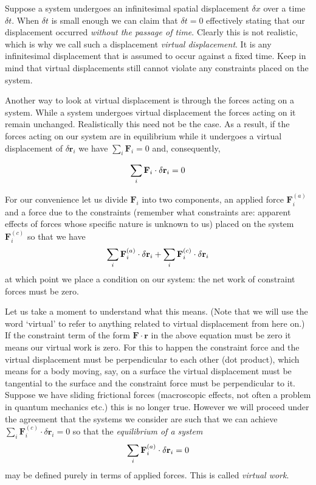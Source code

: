 \documentclass[english,seminar,headertitle]{lecture}
\begin{document}
Suppose a system undergoes an infinitesimal spatial displacement $\delta x$ over a time $\delta t$. When $\delta t$ is small enough we can claim that $\delta t = 0$ effectively stating that our displacement occurred \textit{without the passage of time}. Clearly this is not realistic, which is why we call such a displacement \textit{virtual displacement}. It is any infinitesimal displacement that is assumed to occur against a fixed time. Keep in mind that virtual displacements still cannot violate any constraints placed on the system.

Another way to look at virtual displacement is through the forces acting on a system. While a system undergoes virtual displacement the forces acting on it remain unchanged. Realistically this need not be the case. As a result, if the forces acting on our system are in equilibrium while it undergoes a virtual displacement of $\delta \mathbf{r}_i$ we have $\sum_i \mathbf{F}_i = 0$ and, consequently,

\begin{equation}
\sum\displaylimits_i \mathbf{F}_i \cdot \delta \mathbf{r}_i = 0 \label{eq:virtual-displacement}
\end{equation}

For our convenience let us divide $\mathbf{F}_i$ into two components, an applied force $\mathbf{F}_i^{(a)}$ and a force due to the constraints (remember what constraints are: apparent effects of forces whose specific nature is unknown to us) placed on the system $\mathbf{F}_i^{(c)}$ so that we have $$\sum\displaylimits_i \mathbf{F}_i^{(a)} \cdot \delta \mathbf{r}_i + \sum\displaylimits_i \mathbf{F}_i^{(c)} \cdot \delta \mathbf{r}_i$$ at which point we place a condition on our system: the net work of constraint forces must be zero. 

Let us take a moment to understand what this means. (Note that we will use the word `virtual' to refer to anything related to virtual displacement from here on.) If the constraint term of the form $\mathbf{F} \cdot \mathbf{r}$ in the above equation must be zero it means our virtual work is zero. For this to happen the constraint force and the virtual displacement must be perpendicular to each other (dot product), which means for a body moving, say, on a surface the virtual displacement must be tangential to the surface and the constraint force must be perpendicular to it. Suppose we have sliding frictional forces (macroscopic effects, not often a problem in quantum mechanics etc.) this is no longer true. However we will proceed under the agreement that the systems we consider are such that we can achieve $\sum_i \mathbf{F}_i^{(c)} \cdot \delta \mathbf{r}_i = 0$ so that the \textit{equilibrium of a system}
%
\begin{align}
\sum\displaylimits_i \mathbf{F}_i^{(a)} \cdot \delta \mathbf{r}_i = 0 \label{eq:virtual-work}
\end{align}
%
may be defined purely in terms of applied forces. This is called \textit{virtual work}.
\end{document}
